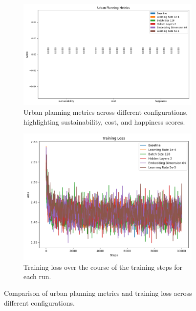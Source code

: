 \documentclass{article} %
\begin{document}
\begin{figure}[h]
    \centering
    \begin{subfigure}{0.49\textwidth}
        \includegraphics[width=\textwidth]{urban_metrics.png}
        \caption{Urban planning metrics across different configurations, highlighting sustainability, cost, and happiness scores.}
        \label{fig:urban_metrics}
    \end{subfigure}
    \hfill
    \begin{subfigure}{0.49\textwidth}
        \includegraphics[width=\textwidth]{training_loss.png}
        \caption{Training loss over the course of the training steps for each run.}
        \label{fig:training_loss}
    \end{subfigure}
    \caption{Comparison of urban planning metrics and training loss across different configurations.}
    \label{fig:results}
\end{figure}
\end{document}
